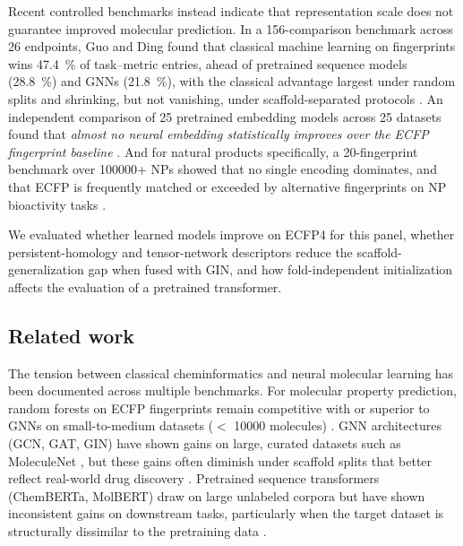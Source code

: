 \documentclass[11pt,a4paper]{article}
\begin{document}
Recent controlled benchmarks instead indicate that representation scale does not guarantee improved molecular prediction. In a \num{156}-comparison benchmark across \num{26} endpoints, Guo and Ding found that classical machine learning on fingerprints wins \qty{47.4}{\percent} of task--metric entries, ahead of pretrained sequence models (\qty{28.8}{\percent}) and GNNs (\qty{21.8}{\percent}), with the classical advantage largest under random splits and shrinking, but not vanishing, under scaffold-separated protocols \citep{guo_ding_2026}. An independent comparison of \num{25} pretrained embedding models across \num{25} datasets found that \emph{almost no neural embedding statistically improves over the ECFP fingerprint baseline} \citep{benchmark_pretrained_2025}. And for natural products specifically, a \num{20}-fingerprint benchmark over \num{100000}+ NPs showed that no single encoding dominates, and that ECFP is frequently matched or exceeded by alternative fingerprints on NP bioactivity tasks \citep{boldini2024}.

We evaluated whether learned models improve on ECFP4 for this panel, whether persistent-homology and tensor-network descriptors reduce the scaffold-generalization gap when fused with GIN, and how fold-independent initialization affects the evaluation of a pretrained transformer.

\subsection{Related work}

The tension between classical cheminformatics and neural molecular learning has been documented across multiple benchmarks. For molecular property prediction, random forests on ECFP fingerprints remain competitive with or superior to GNNs on small-to-medium datasets ($<$ \num{10000} molecules) \citep{guo_ding_2026,benchmark_pretrained_2025}. GNN architectures (GCN, GAT, GIN) have shown gains on large, curated datasets such as MoleculeNet \citep{wu_molnet_2018}, but these gains often diminish under scaffold splits that better reflect real-world drug discovery \citep{guo_ding_2026}. Pretrained sequence transformers (ChemBERTa, MolBERT) draw on large unlabeled corpora but have shown inconsistent gains on downstream tasks, particularly when the target dataset is structurally dissimilar to the pretraining data \citep{chemberta_2020,benchmark_pretrained_2025}.
\end{document}
